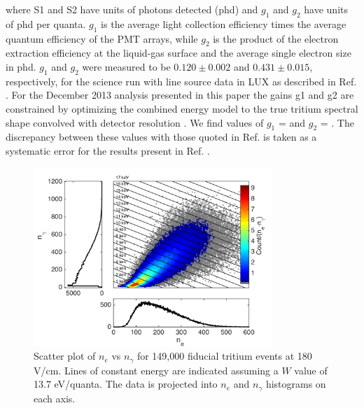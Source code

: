 \noindent
where S1 and S2 have units of photons detected (phd) and $g_1$ and $g_2$ have units of phd per quanta. $g_1$ is the average light collection efficiency times the average quantum efficiency of the PMT arrays, while $g_2$ is the product of the electron extraction efficiency at the liquid-gas surface and the average single electron size in phd. $g_1$ and $g_2$ were measured to be $0.120 \pm 0.002$ and $0.431 \pm 0.015$, respectively, for the science run with line source data in LUX as described in Ref. \cite{lux-reanalysis, lux-prd}. For the December 2013 analysis presented in this paper the gains g1 and g2 are constrained by optimizing the combined energy model to the true tritium spectral shape \cite{Tritium_Eq_Simpson} convolved with detector resolution \cite{Dobi_Thesis}. We find values of $g_1$ = \gone  and  $g_2$ = \gtwo.  The discrepancy between these values with those quoted in Ref. \cite{lux-reanalysis, lux-prd} is taken as a systematic error for the results present in Ref. \cite{lux-reanalysis, lux-prd}.

\begin{figure}[h!]\centering
\includegraphics[width=90mm]{fig/tritium_scatter.png}
\caption{Scatter plot of $n_e$ vs $n_{\gamma}$ for 149,000 fiducial tritium events at 180 V/cm. Lines of constant energy are indicated assuming a $W$ value of 13.7 eV/quanta. The data is projected into $n_e$ and $n_{\gamma}$ histograms on each axis.}
\label{fig:tritium-scatter}
\end{figure}


